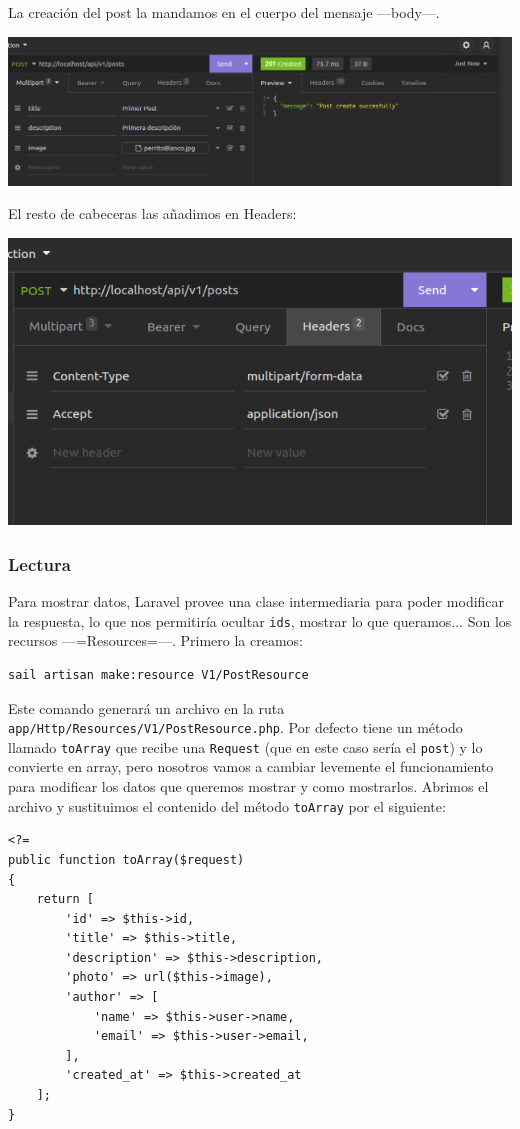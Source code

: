 \documentclass[11pt]{article}
\begin{document}
La creación del post la mandamos en el cuerpo del mensaje —body—.

\begin{center}
\includegraphics[width=.9\linewidth]{PrimerPost.png}
\end{center}

El resto de cabeceras las añadimos en Headers:

\begin{center}
\includegraphics[width=.9\linewidth]{RestoCabeceras.png}
\end{center}


\subsubsection{Lectura}
\label{sec:org3842115}
Para mostrar datos, Laravel provee una clase intermediaria para poder
modificar la respuesta, lo que nos permitiría ocultar \texttt{ids}, mostrar lo
que queramos... Son los recursos —=Resources=—. Primero la creamos:
\begin{verbatim}
sail artisan make:resource V1/PostResource
\end{verbatim}

Este comando generará un archivo en la ruta
\texttt{app/Http/Resources/V1/PostResource.php}. Por defecto tiene un método
llamado \texttt{toArray} que recibe una \texttt{Request} (que en este caso sería el
\texttt{post}) y lo convierte en array, pero nosotros vamos a cambiar levemente
el funcionamiento para modificar los datos que queremos mostrar y como
mostrarlos. Abrimos el archivo y sustituimos el contenido del método
\texttt{toArray} por el siguiente:
\begin{verbatim}
<?=
public function toArray($request)
{
    return [
        'id' => $this->id,
        'title' => $this->title,
        'description' => $this->description,
        'photo' => url($this->image),
        'author' => [
            'name' => $this->user->name,
            'email' => $this->user->email,
        ],
        'created_at' => $this->created_at
    ];
}
\end{verbatim}
\end{document}
